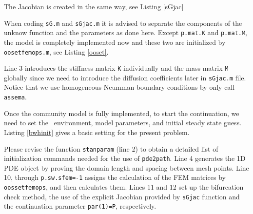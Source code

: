 \documentclass[a4paper,12pt]{article}
\begin{document}
The Jacobian is created in the same way, see Listing \ref{sGjac}


When coding {\tt sG.m} and {\tt sGjac.m} it is advised to separate the components of the unknow function and the parameters as done here. Except {\tt p.mat.K} and {\tt p.mat.M}, the model is completely implemented now and these two are initialized by {\tt oosetfemops.m}, see Listing \ref{ooset}. 

Line 3 introduces the stiffness matrix {\tt K} individually and the mass matrix {\tt M} globally since we need to introduce the diffusion coefficients later in {\tt sGjac.m} file. Notice that we use homogeneous Neumman boundary conditions by only call {\tt assema}. 

Once the community model is fully implemented, to start the continuation, we need to set the \pdep \, environment, model parameters, and initial steady state guess. Listing \ref{bwhinit} gives a basic setting for the present problem. 

Please revise the function {\tt stanparam} (line 2) to obtain a detailed list of initialization commands needed for the use of {\tt pde2path}. Line 4 generates the 1D PDE object by proving the domain length and spacing between mesh points. Line 10, through {\tt p.sw.sfem=-1} assigns the calculation of the FEM matrices by {\tt oossetfemops}, and then calculates them. Lines 11 and 12 set up the bifurcation check method, the use of the explicit Jacobian provided by {\tt sGjac} function and the continuation parameter {\tt par(1)=P}, respectively.


\end{document}
